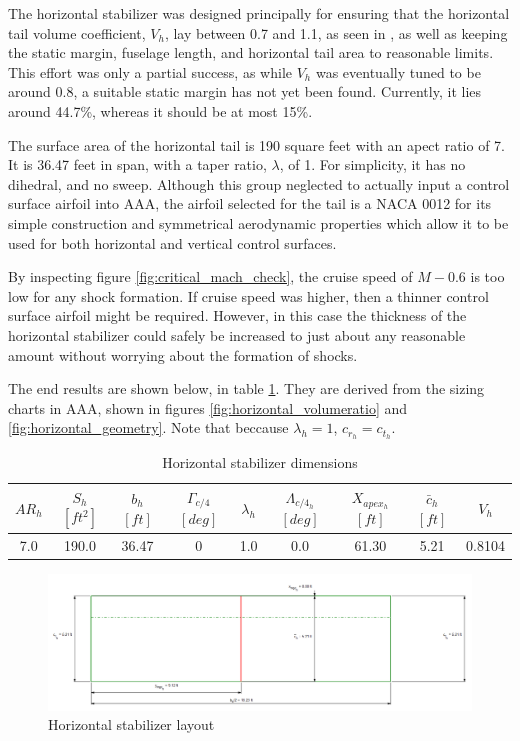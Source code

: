 \documentclass[conf]{new-aiaa}
\begin{document}
The horizontal stabilizer was designed principally for ensuring that the 
horizontal tail volume coefficient, $V_h$, lay between 0.7 and 1.1, as seen 
in \cite{orange_book}, as well as keeping the static margin, fuselage length, 
and horizontal tail area to reasonable limits. This effort was only a 
partial success, as while $V_h$ was eventually tuned to be around 0.8, a 
suitable static margin has not yet been found. Currently, it lies around 44.7\%,
whereas it should be at most 15\%.

The surface area of the horizontal tail is 190 square feet with an apect 
ratio of 7. It is 36.47 feet in span, with a taper ratio, $\lambda$, of 1. 
For simplicity, it has no dihedral, and no sweep. Although this group 
neglected to actually input a control surface airfoil into AAA, the airfoil 
selected for the tail is a NACA 0012 for its simple construction and 
symmetrical aerodynamic properties which allow it to be used for both 
horizontal and vertical control surfaces.

By inspecting figure \ref{fig:critical_mach_check}, the cruise speed of 
$M-0.6$ is too low for any shock formation. If cruise speed was higher, 
then a thinner control surface airfoil might be required. However, in this 
case the thickness of the horizontal stabilizer could safely be increased to 
just about any reasonable amount without worrying about the formation of shocks.

The end results are shown below, in table 
\ref{tab:horizontal_stabilizer_size}. They are derived from the sizing 
charts in AAA, shown in figures \ref{fig:horizontal_volumeratio} and 
\ref{fig:horizontal_geometry}. Note that beccause $\lambda_h = 1$,
$c_{r_h} = c_{t_h}$.

\begin{table}[H]
\centering
\caption{Horizontal stabilizer dimensions}
\begin{tabular}{|c|c|c|c|c|c|c|c|c|}\hline
    $AR_h$ & $S_h$ $[ft^2]$ & $b_h$ $[ft]$ & $\Gamma_{c/4}$ $[deg]$ & $\lambda_h$ & $\Lambda_{c/4_h}$ $[deg]$ & $X_{apex_h}$ $[ft]$ & $\bar{c}_h$ $[ft]$ & $V_h$  \\ \hline
    7.0 & 190.0 & 36.47 & 0 & 1.0 & 0.0 & 61.30 & 5.21 & 0.8104 \\ \hline
\end{tabular}
\label{tab:horizontal_stabilizer_size}
\end{table}

\begin{figure}[H]
    \includegraphics[width=\textwidth]{Report3Printouts/Empannage/Horizontal_geometry_plot.png}
    \caption{Horizontal stabilizer layout}
    \label{fig:horizontal_geometry_plot}
\end{figure}
\end{document}
